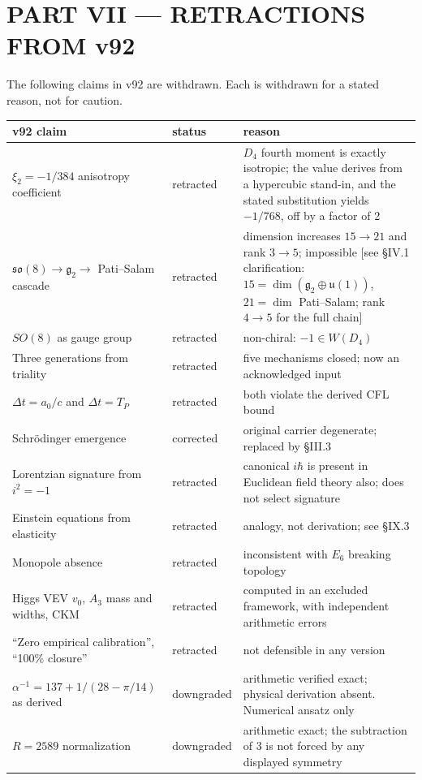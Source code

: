 \documentclass[11pt,a4paper]{article}
\begin{document}
\section{PART VII --- RETRACTIONS FROM v92}
The following claims in v92 are withdrawn. Each is withdrawn for a stated reason, not for caution.
\begin{center}
\begin{tabular}{lll}
\toprule
v92 claim & status & reason \\
\midrule
$\xi_2 = -1/384$ anisotropy coefficient & retracted & $D_4$ fourth moment is exactly isotropic; the value derives from a hypercubic stand-in, and the stated substitution yields $-1/768$, off by a factor of 2 \\
$\mathfrak{so}(8) \to \mathfrak{g}_2 \to$ Pati--Salam cascade & retracted & dimension increases $15 \to 21$ and rank $3 \to 5$; impossible [see \S IV.1 clarification: $15 = \dim(\mathfrak{g}_2\oplus\mathfrak{u}(1))$, $21 = \dim$ Pati--Salam; rank $4 \to 5$ for the full chain] \\
$SO(8)$ as gauge group & retracted & non-chiral: $-1 \in W(D_4)$ \\
Three generations from triality & retracted & five mechanisms closed; now an acknowledged input \\
$\Delta t = a_0/c$ and $\Delta t = T_P$ & retracted & both violate the derived CFL bound \\
Schr\"odinger emergence & corrected & original carrier degenerate; replaced by \S III.3 \\
Lorentzian signature from $i^2 = -1$ & retracted & canonical $i\hbar$ is present in Euclidean field theory also; does not select signature \\
Einstein equations from elasticity & retracted & analogy, not derivation; see \S IX.3 \\
Monopole absence & retracted & inconsistent with $E_6$ breaking topology \\
Higgs VEV $v_0$, $A_3$ mass and widths, CKM & retracted & computed in an excluded framework, with independent arithmetic errors \\
``Zero empirical calibration'', ``100\% closure'' & retracted & not defensible in any version \\
$\alpha^{-1} = 137 + 1/(28 - \pi/14)$ as derived & downgraded & arithmetic verified exact; physical derivation absent. Numerical ansatz only \\
$R = 2589$ normalization & downgraded & arithmetic exact; the subtraction of 3 is not forced by any displayed symmetry \\
\bottomrule
\end{tabular}
\end{center}
\end{document}

